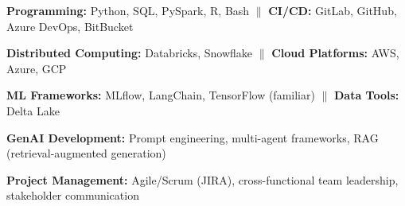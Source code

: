 \begin{zitemize}
    \item \textbf{Programming:} Python, SQL, PySpark, R, Bash $\|$ \textbf{CI/CD:} GitLab, GitHub, Azure DevOps, BitBucket
    \item \textbf{Distributed Computing:} Databricks, Snowflake $\|$ \textbf{Cloud Platforms:} AWS, Azure, GCP
    \item \textbf{ML Frameworks:} MLflow, LangChain, TensorFlow (familiar) $\|$ \textbf{Data Tools:} Delta Lake
    \item \textbf{GenAI Development:} Prompt engineering, multi-agent frameworks, RAG (retrieval-augmented generation)
    \item \textbf{Project Management:} Agile/Scrum (JIRA), cross-functional team leadership, stakeholder communication
\end{zitemize}
